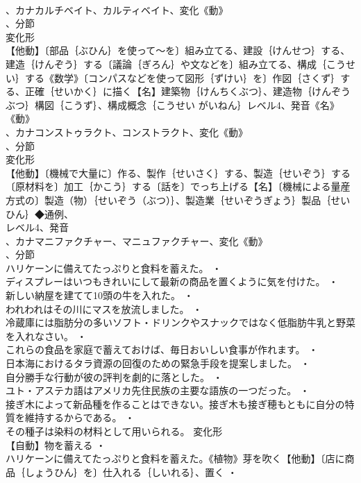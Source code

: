 \documentclass[8pt]{extreport}
\begin{document}
\begin{CJK}{UTF8}{min}
\\	、カナカルチベイト、カルティベイト、変化《動》
\\	、分節
\\	変化形 
\\	【他動】〔部品｛ぶひん｝を使って～を〕組み立てる、建設｛けんせつ｝する、建造｛けんぞう｝する〔議論｛ぎろん｝や文などを〕組み立てる、構成｛こうせい｝する《数学》〔コンパスなどを使って図形｛ずけい｝を〕作図｛さくず｝する、正確｛せいかく｝に描く【名】建築物｛けんちくぶつ｝、建造物｛けんぞうぶつ｝構図｛こうず｝、構成概念｛こうせい がいねん｝レベル4、発音《名》
\\	《動》
\\	、カナコンストゥラクト、コンストラクト、変化《動》
\\	、分節
\\	変化形 
\\	【他動】〔機械で大量に〕作る、製作｛せいさく｝する、製造｛せいぞう｝する〔原材料を〕加工｛かこう｝する〔話を〕でっち上げる【名】〔機械による量産方式の〕製造（物）｛せいぞう（ぶつ）｝、製造業｛せいぞうぎょう｝製品｛せいひん｝◆通例、
\\	レベル4、発音
\\	、カナマニファクチャー、マニュファクチャー、変化《動》
\\	、分節
\\	ハリケーンに備えてたっぷりと食料を蓄えた。 ・
\\	ディスプレーはいつもきれいにして最新の商品を置くように気を付けた。 ・
\\	新しい納屋を建てて10頭の牛を入れた。 ・
\\	われわれはその川にマスを放流しました。 ・
\\	冷蔵庫には脂肪分の多いソフト・ドリンクやスナックではなく低脂肪牛乳と野菜を入れなさい。 ・
\\	これらの食品を家庭で蓄えておけば、毎日おいしい食事が作れます。 ・
\\	日本海におけるタラ資源の回復のための緊急手段を提案しました。 ・
\\	自分勝手な行動が彼の評判を劇的に落とした。 ・
\\	ユト・アステカ語はアメリカ先住民族の主要な語族の一つだった。 ・
\\	接ぎ木によって新品種を作ることはできない。接ぎ木も接ぎ穂もともに自分の特質を維持するからである。 ・
\\	その種子は染料の材料として用いられる。	変化形 
\\	【自動】物を蓄える ・
\\	ハリケーンに備えてたっぷりと食料を蓄えた。《植物》芽を吹く【他動】〔店に商品｛しょうひん｝を〕仕入れる｛しいれる｝、置く ・

\end{CJK}
\end{document}
